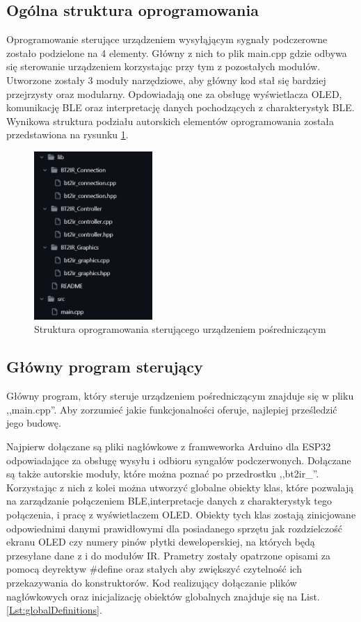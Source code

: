 \documentclass[12pt,twoside]{article}
\begin{document}
\subsection{Ogólna struktura oprogramowania}
Oprogramowanie sterujące urządzeniem wysyłąjącym sygnały podczerowne zostało podzielone na 4 elementy. Główny z nich to plik main.cpp gdzie odbywa się sterowanie urządzeniem korzystając przy tym z pozostałych modułów. Utworzone zostały 3 moduły narzędziowe, aby główny kod stał się bardziej przejrzysty oraz modularny. Opdowiadają one za obsługę wyświetlacza OLED, komunikację BLE oraz interpretację danych pochodzących z charakterystyk BLE. Wynikowa struktura podziału autorskich elementów oprogramowania została przedstawiona na rysunku \ref*{Fig:codeStructure}.
\begin{figure}[ht]
   \centering
   \includegraphics[width=4.5cm]{images/codeStructure.png}
   \caption{Struktura oprogramowania sterującego urządzeniem pośredniczącym}
   \label{Fig:codeStructure}
\end{figure}

\subsection{Główny program sterujący}
Główny program, który steruje urządzeniem pośredniczącym znajduje się w pliku ,,main.cpp''. Aby zorzumieć jakie funkcjonalności oferuje, najlepiej prześledzić jego budowę.

Najpierw dołączane są pliki nagłówkowe z framweworka Arduino dla ESP32 odpowiadające za obsługę wysyłu i odbioru syngałów podczerwonych. Dołączane są także autorskie moduły, które można poznać po przedrostku ,,bt2ir\_''. Korzystając z nich z kolei można utworzyć globalne obiekty klas, które pozwalają na zarządzanie połączeniem BLE,interpretacje danych z charakterystyk tego połączenia, i pracę z  wyświetlaczem OLED. Obiekty tych klas zostają zinicjowane odpowiednimi danymi prawidłowymi dla posiadanego sprzętu jak rozdzielczość ekranu OLED czy numery pinów płytki deweloperskiej, na których będą przesyłane dane z i do modułów IR. Prametry zostały opatrzone opisami za pomocą deyrektyw \#define oraz stałych aby zwiększyć czytelność ich przekazywania do konstruktorów. Kod realizujący dołączanie plików nagłówkowych oraz inicjalizację obiektów globalnych znajduje się na List.\ref{Lst:globalDefinitions}.
\end{document}
